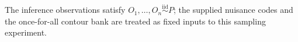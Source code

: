The inference observations satisfy \(O_1,\ldots,O_n\stackrel{\mathrm{iid}}{\sim}P\); the supplied nuisance codes and the once-for-all contour bank are treated as fixed inputs to this sampling experiment.